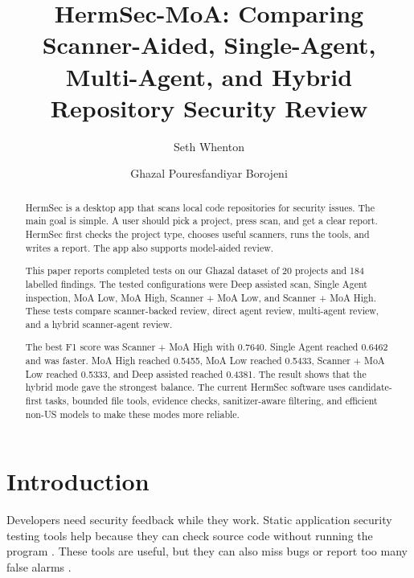 \documentclass[sigconf,nonacm]{acmart}
\begin{document}
\title{HermSec-MoA: Comparing Scanner-Aided, Single-Agent, Multi-Agent, and Hybrid Repository Security Review}

\author{Seth Whenton}
\email{}

\author{Ghazal Pouresfandiyar Borojeni}
\email{}

\begin{abstract}
HermSec is a desktop app that scans local code repositories for security issues. The main goal is simple. A user should pick a project, press scan, and get a clear report. HermSec first checks the project type, chooses useful scanners, runs the tools, and writes a report. The app also supports model-aided review.

This paper reports completed tests on our Ghazal dataset of 20 projects and 184 labelled findings. The tested configurations were Deep assisted scan, Single Agent inspection, MoA Low, MoA High, Scanner + MoA Low, and Scanner + MoA High. These tests compare scanner-backed review, direct agent review, multi-agent review, and a hybrid scanner-agent review.

The best F1 score was Scanner + MoA High with 0.7640. Single Agent reached 0.6462 and was faster. MoA High reached 0.5455, MoA Low reached 0.5433, Scanner + MoA Low reached 0.5333, and Deep assisted reached 0.4381. The result shows that the hybrid mode gave the strongest balance. The current HermSec software uses candidate-first tasks, bounded file tools, evidence checks, sanitizer-aware filtering, and efficient non-US models to make these modes more reliable.
\end{abstract}


\maketitle

\section{Introduction}
Developers need security feedback while they work. Static application security testing tools help because they can check source code without running the program \cite{chess2004static,livshits2005finding}. These tools are useful, but they can also miss bugs or report too many false alarms \cite{zitser2004testing}.
\end{document}
